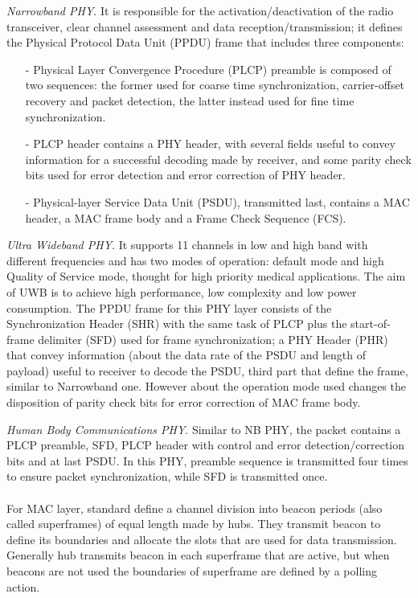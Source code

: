 \documentclass[conference]{IEEEtran}
\begin{document}
\textit{Narrowband PHY}. It is responsible for the activation/deactivation of the radio transceiver, clear channel assessment and data reception/transmission; it defines the Physical Protocol Data Unit (PPDU) frame that includes three components: 
\begin{itemize}
	\item[-] Physical Layer Convergence Procedure (PLCP) preamble is composed of two sequences: the former used for coarse time synchronization, carrier-offset recovery and packet detection, the latter instead used for fine time synchronization.
	\item[-] PLCP header contains a PHY header, with several fields useful to convey information for a successful decoding made by receiver, and some parity check bits used for error detection and error correction of PHY header.
	\item[-] Physical-layer Service Data Unit (PSDU), transmitted last, contains a MAC header, a MAC frame body and a Frame Check Sequence (FCS).
\end{itemize}
\hfill

\textit{Ultra Wideband PHY}. It supports 11 channels in low and high band with different frequencies and has two modes of operation: default mode and high Quality of Service mode, thought for high priority medical applications. The aim of UWB is to achieve high performance, low complexity and low power consumption. The PPDU frame for this PHY layer consists of the Synchronization Header (SHR) with the same task of PLCP plus the start-of-frame delimiter (SFD) used for frame synchronization; a PHY Header (PHR) that convey information (about the data rate of the PSDU and length of payload) useful to receiver to decode the PSDU, third part that define the frame, similar to Narrowband one. However about the operation mode used changes the disposition of parity check bits for error correction of MAC frame body.
\newline

\textit{Human Body Communications PHY}. Similar to NB PHY, the packet contains a PLCP preamble, SFD, PLCP header with control and error detection/correction bits and at last PSDU. In this PHY, preamble sequence is transmitted four times to ensure packet synchronization, while SFD is transmitted once.
\\
\\For MAC layer, standard define a channel division into beacon periods (also called superframes) of equal length made by hubs. They transmit beacon to define its boundaries and allocate the slots that are used for data transmission. Generally hub transmits beacon in each superframe that are active, but when beacons are not used the boundaries of superframe are defined by a polling action.
\end{document}
